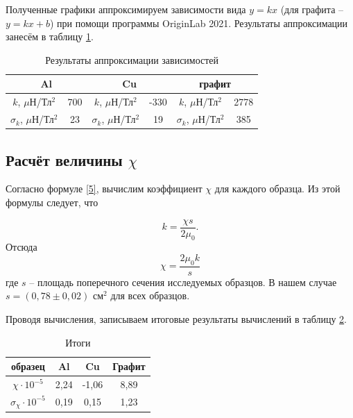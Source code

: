 \documentclass[a4paper,12pt]{article} %
\begin{document}
Полученные графики аппроксимируем зависимости вида $ y = kx $ (для графита -- $ y = kx + b $) при помощи программы OriginLab 2021. Результаты аппроксимации занесём в таблицу \ref{tab:my-table4}.

\begin{table}[H]
	\centering	
	\begin{tabular}{|cc|cc|cc|}
		\hline
		\multicolumn{2}{|c|}{Al}                              & \multicolumn{2}{c|}{Cu}                               & \multicolumn{2}{c|}{графит}                           \\ \hline
		\multicolumn{1}{|c|}{$k$, $\mu$Н/Тл$^2$}        & 700 & \multicolumn{1}{c|}{$k$, $\mu$Н/Тл$^2$}        & -330 & \multicolumn{1}{c|}{$k$, $\mu$Н/Тл$^2$}        & 2778 \\ \hline
		\multicolumn{1}{|c|}{$\sigma_k$, $\mu$Н/Тл$^2$} & 23  & \multicolumn{1}{c|}{$\sigma_k$, $\mu$Н/Тл$^2$} & 19   & \multicolumn{1}{c|}{$\sigma_k$, $\mu$Н/Тл$^2$} & 385  \\ \hline
	\end{tabular}
	\caption{Результаты аппроксимации зависимостей}
	\label{tab:my-table4}
\end{table}

\subsection{Расчёт величины $ \chi $}

Согласно формуле \eqref{5}, вычислим коэффициент $ \chi $ для каждого образца. Из этой формулы следует, что

\begin{equation}\label{6}
k = \frac{\chi s}{2\mu_0}.
\end{equation}
Отсюда
\begin{equation}\label{7}
\boxed{\chi = \frac{2\mu_0 k}{s}}
\end{equation}
где $ s $ -- площадь поперечного сечения исследуемых образцов. В нашем случае $ s = (0,78 \pm 0,02) $ см$ ^2 $ для всех образцов.

Проводя вычисления, записываем итоговые результаты вычислений в таблицу \ref{tab:my-table5}.

\begin{table}[H]
	\centering
	\begin{tabular}{|c|c|c|c|}
		\hline
		образец  & Al   & Cu    & Графит \\ \hline
		$ \chi \cdot 10^{-5} $       & 2,24 & -1,06 & 8,89   \\ \hline
		$ \sigma_\chi \cdot 10^{-5} $ & 0,19 & 0,15  & 1,23   \\ \hline
	\end{tabular}
	\caption{Итоги}
	\label{tab:my-table5}
\end{table}
\end{document}
